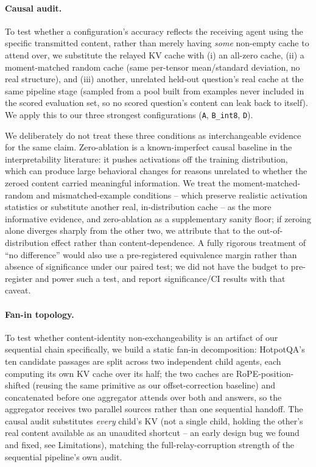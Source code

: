 \documentclass[11pt]{article}
\begin{document}
\paragraph{Causal audit.} To test whether a configuration's accuracy
reflects the receiving agent using the specific transmitted content,
rather than merely having \emph{some} non-empty cache to attend over, we
substitute the relayed KV cache with (i) an all-zero cache, (ii) a
moment-matched random cache (same per-tensor mean/standard deviation, no
real structure), and (iii) another, unrelated held-out question's real
cache at the same pipeline stage (sampled from a pool built from examples
never included in the scored evaluation set, so no scored question's
content can leak back to itself). We apply this to our three strongest
configurations (\texttt{A}, \texttt{B\_int8}, \texttt{D}).

We deliberately do not treat these three conditions as interchangeable
evidence for the same claim. Zero-ablation is a known-imperfect causal
baseline in the interpretability literature: it pushes activations off the
training distribution, which can produce large behavioral changes for
reasons unrelated to whether the zeroed content carried meaningful
information. We treat the moment-matched-random and mismatched-example
conditions -- which preserve realistic activation statistics or substitute
another real, in-distribution cache -- as the more informative evidence,
and zero-ablation as a supplementary sanity floor; if zeroing alone
diverges sharply from the other two, we attribute that to the
out-of-distribution effect rather than content-dependence. A fully
rigorous treatment of ``no difference'' would also use a pre-registered
equivalence margin rather than absence of significance under our paired
test; we did not have the budget to pre-register and power such a test,
and report significance/CI results with that caveat.

\paragraph{Fan-in topology.} To test whether content-identity
non-exchangeability is an artifact of our sequential chain specifically,
we build a static fan-in decomposition: HotpotQA's ten candidate passages
are split across two independent child agents, each computing its own KV
cache over its half; the two caches are RoPE-position-shifted (reusing
the same primitive as our offset-correction baseline) and concatenated
before one aggregator attends over both and answers, so the aggregator
receives two parallel sources rather than one sequential handoff. The
causal audit substitutes \emph{every} child's KV (not a single child,
holding the other's real content available as an unaudited shortcut --
an early design bug we found and fixed, see Limitations), matching the
full-relay-corruption strength of the sequential pipeline's own audit.
\end{document}
